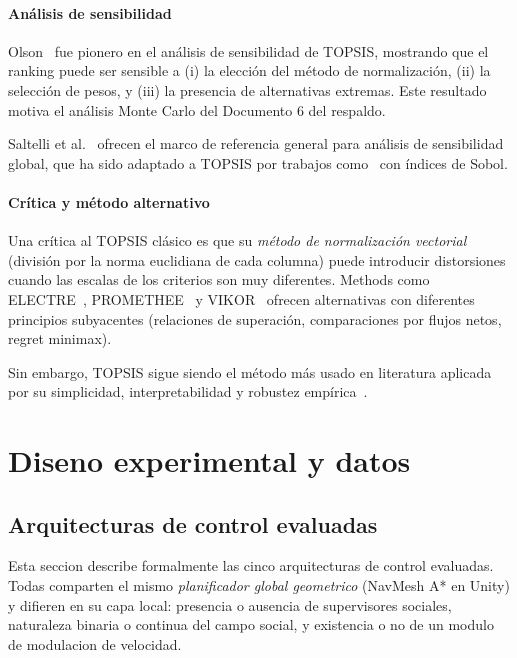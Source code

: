 \documentclass[12pt,a4paper,oneside]{book}
\begin{document}
\subsection{Análisis de sensibilidad}

Olson~\cite{Olson2004} fue pionero en el análisis de sensibilidad de TOPSIS, mostrando que el ranking puede ser sensible a (i) la elección del método de normalización, (ii) la selección de pesos, y (iii) la presencia de alternativas extremas. Este resultado motiva el análisis Monte Carlo del Documento 6 del respaldo.

Saltelli et al.~\cite{Saltelli2008} ofrecen el marco de referencia general para análisis de sensibilidad global, que ha sido adaptado a TOPSIS por trabajos como~\cite{Yazdani2017} con índices de Sobol.

\subsection{Crítica y método alternativo}

Una crítica al TOPSIS clásico es que su \emph{método de normalización vectorial} (división por la norma euclidiana de cada columna) puede introducir distorsiones cuando las escalas de los criterios son muy diferentes. Methods como ELECTRE~\cite{Roy1991}, PROMETHEE~\cite{Brans1986} y VIKOR~\cite{Opricovic2004} ofrecen alternativas con diferentes principios subyacentes (relaciones de superación, comparaciones por flujos netos, regret minimax).

Sin embargo, TOPSIS sigue siendo el método más usado en literatura aplicada por su simplicidad, interpretabilidad y robustez empírica~\cite{Velasquez2013,Mathew2023}.

\newpage


\part{Diseno experimental y datos}

\chapter{Arquitecturas de control evaluadas}
\label{chap:metodos}

Esta seccion describe formalmente las cinco arquitecturas de control evaluadas. Todas comparten el mismo \emph{planificador global geometrico} (NavMesh A* en Unity) y difieren en su capa local: presencia o ausencia de supervisores sociales, naturaleza binaria o continua del campo social, y existencia o no de un modulo de modulacion de velocidad.
\end{document}
